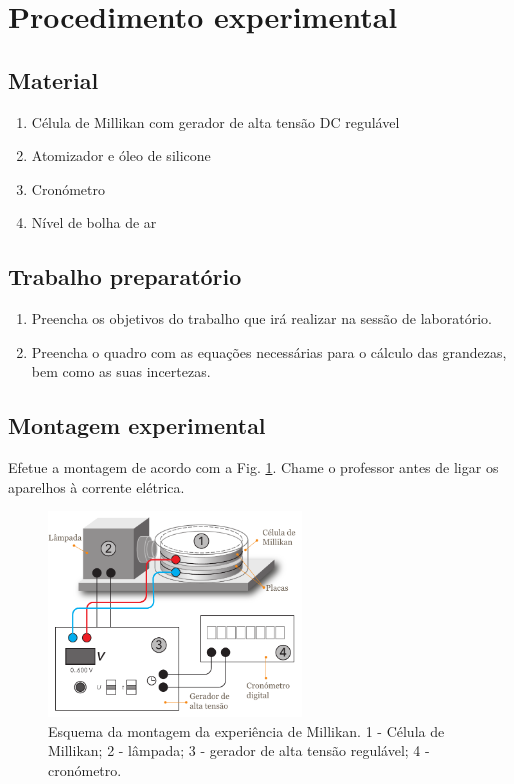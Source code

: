 \documentclass[12pt,a4paper,oneside]{paper}
\begin{document}
\newpage
\section{\sf Procedimento experimental}


\subsection{\sf Material}

\begin{enumerate}
	\item Célula de Millikan com gerador de alta tensão DC regulável
	\item  Atomizador e óleo de silicone
	\item Cronómetro
	\item Nível de bolha de ar%
\end{enumerate}


\subsection{\sf Trabalho preparatório} 
\begin{enumerate}
\item Preencha os objetivos do trabalho que irá realizar na sessão de laboratório. 
\item Preencha o quadro com as equações necessárias para o cálculo das grandezas, bem como as suas incertezas. 
\end{enumerate}

\subsection{\sf Montagem experimental}
Efetue a montagem de acordo com a Fig. \ref{fig:esquema-millikan}. Chame o professor antes de ligar os aparelhos à corrente
elétrica.

\begin{figure}[H]
	[htb]  \centering 
	\includegraphics[width=0.6\textwidth]{./milikan_images/Esquema-Millikan.pdf}
	\caption{Esquema da montagem da experiência de Millikan. 1 - Célula de Millikan; 2 - lâmpada; 3 - gerador de alta tensão
    regulável; 4 - cronómetro.\label{fig:esquema-millikan}} 
\end{figure}
\end{document}
